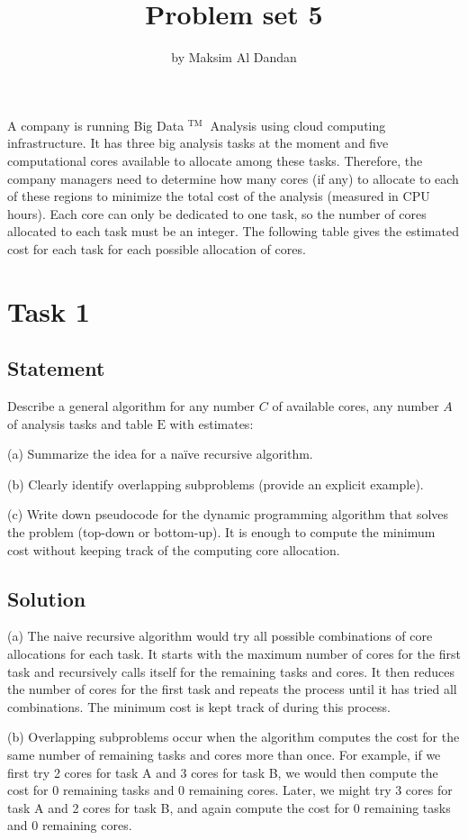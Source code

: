 \documentclass{article}
\title{Problem set 5}
\author{by Maksim Al Dandan}
\begin{document}
\maketitle

A company is running Big Data ${ }^{\text {TM }}$ Analysis using cloud computing infrastructure. It has three big analysis tasks at the moment and five computational cores available to allocate among these tasks. Therefore, the company managers need to determine how many cores (if any) to allocate to each of these regions to minimize the total cost of the analysis (measured in CPU hours). Each core can only be dedicated to one task, so the number of cores allocated to each task must be an integer. The following table gives the estimated cost for each task for each possible allocation of cores.

\section{Task 1}
\subsection{Statement}

Describe a general algorithm for any number $C$ of available cores, any number $A$ of analysis tasks and table $\mathrm{E}$ with estimates:

(a) Summarize the idea for a naïve recursive algorithm.

(b) Clearly identify overlapping subproblems (provide an explicit example).

(c) Write down pseudocode for the dynamic programming algorithm that solves the problem (top-down or bottom-up). It is enough to compute the minimum cost without keeping track of the computing core allocation.

\subsection{Solution}

(a) The naive recursive algorithm would try all possible combinations of core allocations for each task. It starts with the maximum number of cores for the first task and recursively calls itself for the remaining tasks and cores. It then reduces the number of cores for the first task and repeats the process until it has tried all combinations. The minimum cost is kept track of during this process.

(b) Overlapping subproblems occur when the algorithm computes the cost for the same number of remaining tasks and cores more than once. For example, if we first try 2 cores for task A and 3 cores for task B, we would then compute the cost for 0 remaining tasks and 0 remaining cores. Later, we might try 3 cores for task A and 2 cores for task B, and again compute the cost for 0 remaining tasks and 0 remaining cores.
\end{document}
